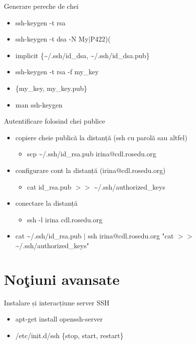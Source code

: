 \documentclass{beamer}
\begin{document}
\begin{frame}{Generare pereche de chei}
  \begin{itemize}
    \item ssh-keygen -t rsa
    \item ssh-keygen -t dsa -N My$|$P422)(
    \item implicit \{\~{}/.ssh/id\_dsa, \~{}/.ssh/id\_dsa.pub\}
    \item ssh-keygen -t rsa -f my\_key
    \item \{my\_key, my\_key.pub\}
    \item man ssh-keygen
  \end{itemize}
\end{frame}

\begin{frame}{Autentificare folosind chei publice}
  \begin{itemize}
    \pause \item copiere cheie publică la distanță (ssh cu parolă sau altfel)
      \begin{itemize}
        \pause \item scp \~{}/.ssh/id\_rsa.pub irina@cdl.rosedu.org
      \end{itemize}
    \pause \item configurare cont la distanță (irina@cdl.rosedu.org)
      \begin{itemize}
        \pause \item cat id\_rsa.pub $>>$ \~{}/.ssh/authorized\_keys
      \end{itemize}
    \pause \item conectare la distanță
      \begin{itemize}
        \pause \item ssh -l irina cdl.rosedu.org
      \end{itemize}
    \pause \item cat \~{}/.ssh/id\_rsa.pub $|$ ssh irina@cdl.rosedu.org "cat
$>>$ \~{}/.ssh/authorized\_keys"
  \end{itemize}
\end{frame}

\section{No\c{t}iuni avansate}
\frame{\tableofcontents[currentsection]}

\begin{frame}{Instalare și interacțiune server SSH}
  \begin{itemize}
    \item apt-get install openssh-server
    \item /etc/init.d/ssh \{stop, start, restart\}
  \end{itemize}
\end{frame}
\end{document}
